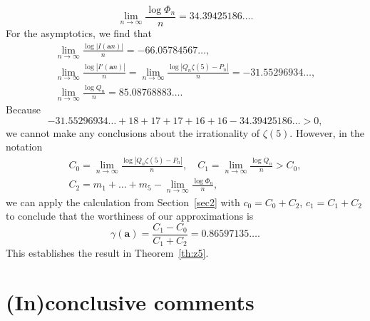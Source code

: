 \documentclass[12pt,reqno]{amsart}
\theoremstyle{remark}
\newcommand\ba{\boldsymbol a}
\begin{document}
\[
\lim_{n\to\infty}\frac{\log\Phi_n}n=34.39425186\dotsc . 
\]
For the asymptotics, we find that
\begin{gather*}
\lim_{n\to\infty}\frac{\log|I(\ba n)|}n=-66.05784567\dots,
\\
\lim_{n\to\infty}\frac{\log|I'(\ba n)|}n
=\lim_{n\to\infty}\frac{\log|Q_n\zeta(5)-P_n|}n=-31.55296934\dots,
\\
\lim_{n\to\infty}\frac{\log Q_n}n=85.08768883\dotsc.
\end{gather*}
Because
\[
-31.55296934\hdots+18+17+17+16+16-34.39425186\hdots>0,
\]
we cannot make any conclusions  about the irrationality of $\zeta(5)$.
However, in the notation
\begin{gather*}
C_0=\lim_{n\to\infty}\frac{\log|Q_n\zeta(5)-P_n|}n,
\quad
C_1=\lim_{n\to\infty}\frac{\log Q_n}n>C_0,
\\
C_2=m_1+\dots+m_5-\lim_{n\to\infty}\frac{\log\Phi_n}n,
\end{gather*}
we can apply the calculation from Section~\ref{sec2} with $c_0=C_0+C_2$, $c_1=C_1+C_2$ to conclude that the worthiness of our approximations is
\[
\gamma(\ba)=\frac{C_1-C_0}{C_1+C_2}=0.86597135\dotsc.
\]
This establishes the result in Theorem~\ref{th:z5}.

\section{(In)conclusive comments}
\label{final}
\end{document}
